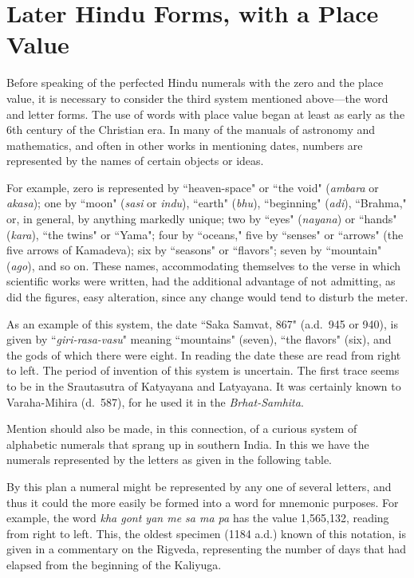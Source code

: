 \documentclass[11pt,a4paper]{article}
\begin{document}
\section{Later Hindu Forms, with a Place Value}

Before speaking of the perfected Hindu numerals with the zero and the place value, it is necessary to consider the third system mentioned above---the word and letter forms. The use of words with place value began at least as early as the 6th century of the Christian era. In many of the manuals of astronomy and mathematics, and often in other works in mentioning dates, numbers are represented by the names of certain objects or ideas.

For example, zero is represented by ``heaven-space" or ``the void" (\textit{ambara} or \textit{akasa}); one by ``moon" (\textit{sasi} or \textit{indu}), ``earth" (\textit{bhu}), ``beginning" (\textit{adi}), ``Brahma," or, in general, by anything markedly unique; two by ``eyes" (\textit{nayana}) or ``hands" (\textit{kara}), ``the twins" or ``Yama"; four by ``oceans," five by ``senses" or ``arrows" (the five arrows of Kamadeva); six by ``seasons" or ``flavors"; seven by ``mountain" (\textit{ago}), and so on. These names, accommodating themselves to the verse in which scientific works were written, had the additional advantage of not admitting, as did the figures, easy alteration, since any change would tend to disturb the meter.

As an example of this system, the date ``Saka Samvat, 867" (a.d.~945 or 940), is given by ``\textit{giri-rasa-vasu}" meaning ``mountains" (seven), ``the flavors" (six), and the gods of which there were eight. In reading the date these are read from right to left. The period of invention of this system is uncertain. The first trace seems to be in the Srautasutra of Katyayana and Latyayana. It was certainly known to Varaha-Mihira (d.~587), for he used it in the \textit{Brhat-Samhita}.

Mention should also be made, in this connection, of a curious system of alphabetic numerals that sprang up in southern India. In this we have the numerals represented by the letters as given in the following table.

By this plan a numeral might be represented by any one of several letters, and thus it could the more easily be formed into a word for mnemonic purposes. For example, the word \textit{kha gont yan me sa ma pa} has the value 1,565,132, reading from right to left. This, the oldest specimen (1184 a.d.) known of this notation, is given in a commentary on the Rigveda, representing the number of days that had elapsed from the beginning of the Kaliyuga.
\end{document}
